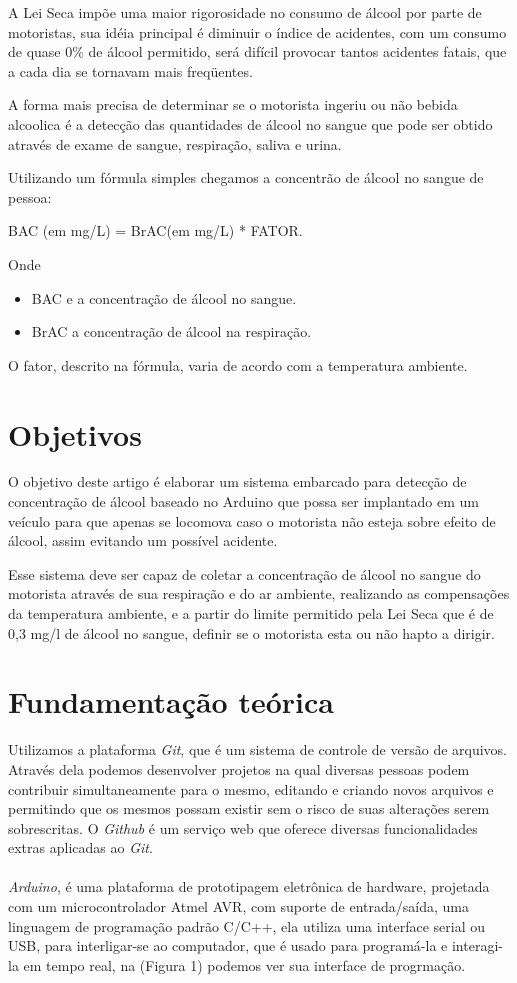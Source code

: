 \documentclass[12pt]{article}
\begin{document}
A Lei Seca impõe uma maior rigorosidade no consumo de álcool por parte de motoristas, sua idéia principal é diminuir o índice de acidentes, com um consumo de quase 0\% de álcool permitido, será difícil provocar tantos acidentes fatais, que a cada dia se tornavam mais freqüentes. 

A forma mais precisa de determinar se o motorista ingeriu ou
não bebida alcoolica é a detecção das quantidades de álcool no
sangue que pode ser obtido através de exame de sangue,
respiração, saliva e urina.

Utilizando um fórmula simples chegamos a concentrão de álcool no sangue de pessoa: 
\begin{center}
BAC (em mg/L) = BrAC(em mg/L) * FATOR.
\end{center}
Onde 
\begin{itemize}
    \item BAC e a concentração de álcool no sangue.
    \item BrAC a concentração de álcool na respiração.
\end{itemize}
O fator, descrito na fórmula, varia de acordo com a temperatura ambiente.


\section{Objetivos} \label{sec:firstpage}

O objetivo deste artigo é elaborar um sistema embarcado
para detecção de concentração de álcool baseado no Arduino que possa ser implantado em um veículo para que apenas se locomova caso o
motorista não esteja sobre efeito de álcool, assim evitando um
possível acidente.

Esse sistema deve ser capaz de coletar a concentração de álcool no sangue do motorista através de sua respiração e do ar ambiente, realizando as compensações da temperatura ambiente, e a partir do limite permitido pela Lei Seca que é de 0,3 mg/l de álcool no sangue, definir se o motorista esta ou não hapto a dirigir.

\section{Fundamentação teórica}

Utilizamos a plataforma \emph{Git}, que é um sistema de controle de versão de arquivos. Através
dela podemos desenvolver projetos na qual diversas pessoas
podem contribuir simultaneamente para o mesmo, editando e
criando novos arquivos e permitindo que os mesmos possam
existir sem o risco de suas alterações serem sobrescritas. O \emph{Github} é um serviço web que oferece diversas
funcionalidades extras aplicadas ao \emph{Git}.\\
\\
\emph{Arduino}, é uma plataforma de prototipagem eletrônica de hardware, projetada com um microcontrolador Atmel AVR, com suporte de entrada/saída, uma linguagem de programação padrão C/C++, ela utiliza uma interface serial ou USB, para interligar-se ao computador, que é usado para programá-la e interagi-la em tempo real, na (Figura 1) podemos ver sua interface de progrmação.
\end{document}
